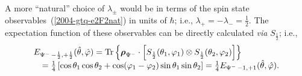{A more ``natural'' choice of $\lambda_\pm$ would be in terms of the spin state observables~(\ref{2004-gtq-e2F2nat}) in units of $\hbar$;
i.e., $  \lambda_+ = -  \lambda_- =\frac{1}{2}$.
The expectation function of  these observables can be directly calculated {\it via} $S_{\frac{1}{2}}$; i.e.,
\begin{equation}
\begin{array}{l}
E_{{ {\Psi^-}}\,-\frac{1}{2},+ \frac{1}{2} } ({\hat \theta},{\hat \varphi} )=
{\rm Tr}\left\{ {\boldsymbol{\rho}}_{ {\Psi^-}} \cdot \left[ S_{\frac{1}{2}}(\theta_1,\varphi_1) \otimes S_{\frac{1}{2}}(\theta_2,\varphi_2)\right]\right\} \\
\quad =
\frac{1}{4} \left[\cos
    \theta_1  \cos  \theta_2 +\cos ( \varphi_1 - \varphi_2 ) \sin \theta_1  \sin  \theta_2 \right]
= \frac{1}{4}E_{{ {\Psi^-}}\,-1 ,+1 } ({\hat \theta},{\hat \varphi} )
.
\label{2009-gtq-sso2}
\end{array}
\end{equation}


\eexample
}


